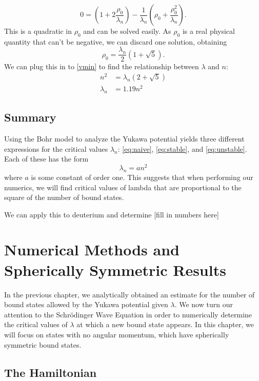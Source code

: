 \documentclass[12pt,twoside]{reedthesis}
\newcommand{\eqn}[1]{\begin{equation}#1\end{equation}}
\begin{document}
\begin{equation}
0 = (1+2 \frac{\rho_0}{\lambda_n}) - \frac{1}{\lambda_n}(\rho_0 + \frac{\rho_0^2}{\lambda_n})\mbox{.} 
\end{equation}
This is a quadratic in $\rho_0$ and can be solved easily.
As $\rho_0$ is a real physical quantity that can't be negative, we can discard one solution, obtaining
\begin{equation}
\rho_0 = \frac{\lambda_n}{2}(1+\sqrt{5})\mbox{.}
\end{equation}
We can plug this in to \eqref{vmin} to find the relationship between $\lambda$ and $n$:
\begin{align}
n^2 &= \lambda_{n}(2 + \sqrt{5}) \\
\lambda_n &= 1.19 n^2
\label{eq:unstable}
\end{align}
\section{Summary}
Using the Bohr model to analyze the Yukawa potential yields three different expressions for the critical values $\lambda_n$: \eqref{eq:naive}, \eqref{eq:stable}, and \eqref{eq:unstable}. Each of these has the form 
\eqn{
\lambda_{n} = a n^2
}
where $a$ is some constant of order one. This suggests that when performing our numerics, we will find critical values of lambda that are proportional to the square of the number of bound states. 

We can apply this to deuterium and determine [fill in numbers here]

\clearpage %

\chapter{Numerical Methods and Spherically Symmetric Results}

In the previous chapter, we analytically obtained an estimate for the number of bound states allowed by the Yukawa potential given $\lambda$.  We now turn our attention to the Schr\"odinger Wave Equation in order to numerically determine the critical values of $\lambda$ at which a new bound state appears. In this chapter, we will focus on states with no angular momentum, which have spherically symmetric bound states.

\section{The Hamiltonian}
\end{document}
